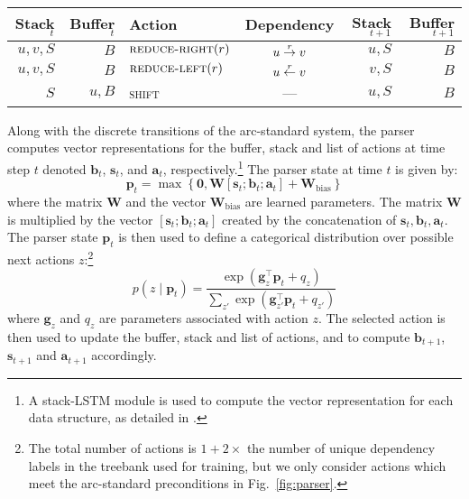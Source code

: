 \documentclass[11pt]{article}
\begin{document}
\begin{table*}[!]
\centering
\begin{tabular}{r|r||l|c||r|r}
\textbf{Stack}$_t$ & \textbf{Buffer}$_t$ & \textbf{Action} & \textbf{Dependency} & \textbf{Stack}$_{t+1}$ & \textbf{Buffer}$_{t+1}$ \\
\hline
$u,v,S$ & $B$  &$\textsc{reduce-right}(r)$ & $u \stackrel{\scriptsize{r}}{\rightarrow} v$ & $u,S$ & $B$ \\
$u,v,S$ & $B$ & $\textsc{reduce-left}(r)$ & $u \stackrel{\scriptsize{r}}{\leftarrow} v$ & $v,S$ & $B$ \\
$S$ & $u,B$ & \textsc{shift} & ---  & $u,S$ & $B$
\end{tabular}
\caption{\label{fig:parser} Parser transitions indicating the action applied to the stack and buffer at time $t$ and the resulting stack and buffer at time $t+1$.}
\end{table*}

Along with the discrete transitions of the arc-standard system, the parser computes vector representations for the buffer, stack and list of actions at time step $t$ denoted $\mathbf{b}_t$, $\mathbf{s}_t$, and $\mathbf{a}_t$, respectively.\footnote{A stack-LSTM module is used to compute the vector representation for each data structure, as detailed in .}
The parser state at time $t$ is given by:
\begin{equation}
\mathbf{p}_t = \max\left\{ \boldsymbol{0}, \mathbf{W}[\mathbf{s}_t; \mathbf{b}_t; \mathbf{a}_t] + \mathbf{W}_{\text{bias}}\right\}
\label{eq:parser_state}
\end{equation}
where the matrix $\mathbf{W}$ and the vector $\mathbf{W}_{\text{bias}}$ are learned parameters. The matrix $\mathbf{W}$ is multiplied by the vector $[\mathbf{s}_t; \mathbf{b}_t; \mathbf{a}_t]$ created by the concatenation of $\mathbf{s}_t, \mathbf{b}_t, \mathbf{a}_t$.
The parser state $\mathbf{p}_t$ is then used to define a categorical distribution over possible next actions $z$:\footnote{The total number of actions is $1 + 2 \times$ the number of unique dependency labels in the treebank used for training, but we only consider actions which meet the arc-standard preconditions in Fig.~\ref{fig:parser}.}
\begin{equation}
p(z \mid \mathbf{p}_t) = \frac{\exp \left( \mathbf{g}_{z}^{\top} \mathbf{p}_t + q_{z} \right)}{\sum_{z'} \exp \left( \mathbf{g}_{z'}^{\top} \mathbf{p}_t + q_{z'} \right)}
\label{eq:action_prob}
\end{equation}
where $\mathbf{g}_z$ and $q_z$ are parameters associated with action $z$.
The selected action is then used to update the buffer, stack and list of actions, and to compute $\mathbf{b}_{t+1}$, $\mathbf{s}_{t+1}$ and $\mathbf{a}_{t+1}$ accordingly.
\end{document}
